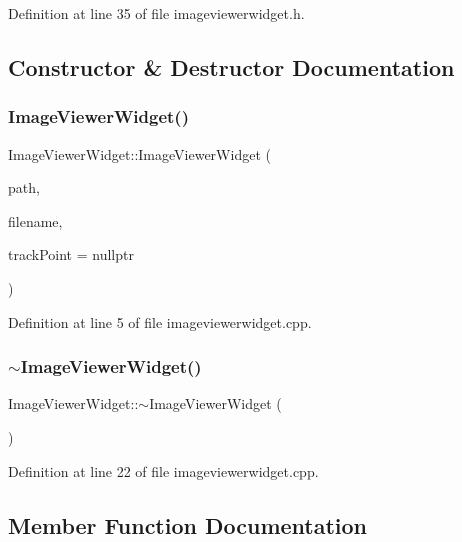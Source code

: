 Definition at line 35 of file imageviewerwidget.\+h.



\subsection{Constructor \& Destructor Documentation}
\mbox{\label{class_image_viewer_widget_a3ac9e23f6d399afb408d9e5f4346f0ca}} 
\subsubsection{\texorpdfstring{ImageViewerWidget()}{ImageViewerWidget()}}
{\footnotesize\ttfamily Image\+Viewer\+Widget\+::\+Image\+Viewer\+Widget (\begin{DoxyParamCaption}\item[{Q\+String}]{path,  }\item[{Q\+String}]{filename,  }\item[{\mbox{\hyperlink{struct_track_point_property}{Track\+Point\+Property}} $\ast$}]{track\+Point = {\ttfamily nullptr} }\end{DoxyParamCaption})}



Definition at line 5 of file imageviewerwidget.\+cpp.

\mbox{\label{class_image_viewer_widget_a9a0a76880c98934a048b8c787583d181}} 
\subsubsection{\texorpdfstring{$\sim$ImageViewerWidget()}{~ImageViewerWidget()}}
{\footnotesize\ttfamily Image\+Viewer\+Widget\+::$\sim$\+Image\+Viewer\+Widget (\begin{DoxyParamCaption}{ }\end{DoxyParamCaption})}



Definition at line 22 of file imageviewerwidget.\+cpp.



\subsection{Member Function Documentation}
\mbox{\label{class_image_viewer_widget_ad299df10dddc344004fe170af436b88e}} 
